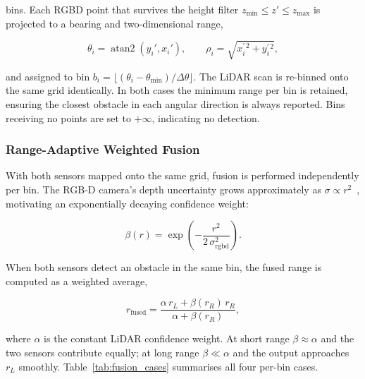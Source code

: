 bins. Each RGBD point that survives the height filter
$z_{\min} \leq z' \leq z_{\max}$ is projected to a bearing and
two-dimensional range,

\begin{equation}
    \theta_{i} = \operatorname{atan2}(y_{i}', x_{i}'),
    \qquad
    \rho_{i} = \sqrt{x_{i}^{\prime\,2} + y_{i}^{\prime\,2}},
    \label{eq:project}
\end{equation}

and assigned to bin $b_{i} = \lfloor(\theta_{i} -
\theta_{\min})/\Delta\theta\rfloor$. The LiDAR scan is re-binned onto
the same grid identically. In both cases the minimum range per bin is
retained, ensuring the closest obstacle in each angular direction is
always reported. Bins receiving no points are set to $+\infty$,
indicating no detection.

\subsubsection{Range-Adaptive Weighted Fusion}

With both sensors mapped onto the same grid, fusion is performed
independently per bin. The RGB-D camera's depth uncertainty grows
approximately as $\sigma \propto r^{2}$~\cite{delhibabu2026},
motivating an exponentially decaying confidence weight:

\begin{equation}
    \beta(r) = \exp\!\left(-\frac{r^{2}}{2\,\sigma_{\text{rgbd}}^{2}}\right).
    \label{eq:beta}
\end{equation}

When both sensors detect an obstacle in the same bin, the fused range
is computed as a weighted average,

\begin{equation}
    r_{\text{fused}} =
        \frac{\alpha\,r_{L} + \beta(r_{R})\,r_{R}}{\alpha + \beta(r_{R})},
    \label{eq:fusion}
\end{equation}

where $\alpha$ is the constant LiDAR confidence weight. At short range
$\beta \approx \alpha$ and the two sensors contribute equally; at long
range $\beta \ll \alpha$ and the output approaches $r_{L}$ smoothly.
Table~\ref{tab:fusion_cases} summarises all four per-bin cases.

